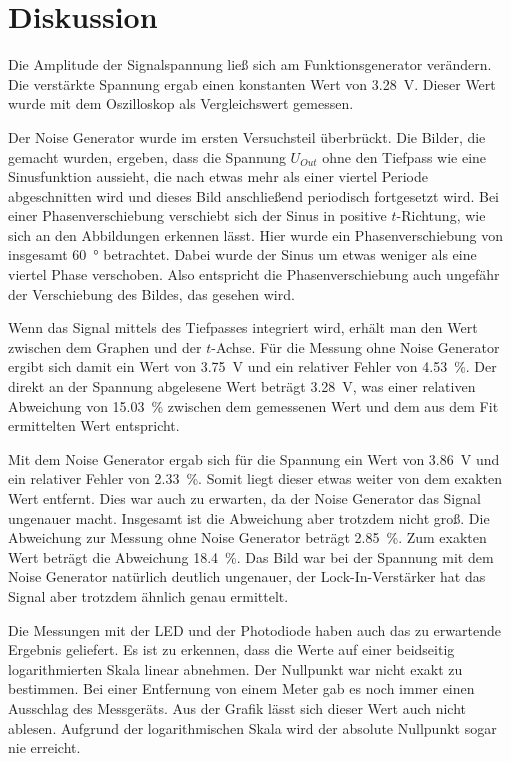 \section{Diskussion}
\label{sec:Diskussion}

Die Amplitude der Signalspannung ließ sich am Funktionsgenerator verändern. Die verstärkte Spannung ergab einen konstanten 
Wert von \SI{3.28}{\V}. Dieser Wert wurde mit dem Oszilloskop als Vergleichswert gemessen. %

\noindent Der Noise Generator wurde im ersten Versuchsteil überbrückt. Die Bilder, die gemacht wurden, ergeben, dass 
die Spannung $U_{Out}$ ohne den Tiefpass wie eine Sinusfunktion aussieht, die nach etwas mehr als einer viertel 
Periode abgeschnitten wird und dieses Bild anschließend periodisch fortgesetzt wird. 
Bei einer Phasenverschiebung verschiebt sich der Sinus in positive $t$-Richtung, wie sich an den Abbildungen 
erkennen lässt. Hier wurde ein Phasenverschiebung von insgesamt \SI{60}{\degree} betrachtet. %
Dabei wurde der Sinus 
um etwas weniger als eine viertel Phase verschoben. Also entspricht die Phasenverschiebung auch ungefähr der 
Verschiebung des Bildes, das gesehen wird. 

\noindent Wenn das Signal mittels des Tiefpasses integriert wird, erhält man den Wert zwischen dem Graphen und der 
$t$-Achse. Für die Messung ohne Noise Generator ergibt sich damit ein Wert von \SI{3.75}{\volt} und ein relativer 
Fehler von \SI{4.53}{\percent}. Der direkt an der Spannung abgelesene Wert beträgt \SI{3.28}{\volt}, was einer%
relativen Abweichung von \SI{15.03}{\percent} zwischen dem gemessenen Wert und dem aus dem Fit ermittelten Wert 
entspricht. 

\noindent Mit dem Noise Generator ergab sich für die Spannung ein Wert von \SI{3.86}{\volt} und ein relativer 
Fehler von \SI{2.33}{\percent}. Somit liegt dieser etwas weiter von dem exakten Wert entfernt. Dies war auch zu 
erwarten, da der Noise Generator das Signal ungenauer macht. Insgesamt ist die Abweichung aber trotzdem nicht %
groß. Die Abweichung zur Messung ohne Noise Generator beträgt \SI{2.85}{\percent}. Zum exakten Wert beträgt die 
Abweichung \SI{18.4}{\percent}. Das Bild war bei der Spannung mit dem Noise Generator natürlich deutlich ungenauer, 
der Lock-In-Verstärker hat das Signal aber trotzdem ähnlich genau ermittelt. 

\noindent Die Messungen mit der LED und der Photodiode haben auch das zu erwartende Ergebnis geliefert. Es ist zu 
erkennen, dass die Werte auf einer beidseitig logarithmierten Skala linear abnehmen. Der Nullpunkt war nicht exakt 
zu bestimmen. Bei einer Entfernung von einem Meter gab es noch immer einen Ausschlag des Messgeräts. Aus der Grafik 
lässt sich dieser Wert auch nicht ablesen. Aufgrund der logarithmischen Skala wird der absolute Nullpunkt sogar nie 
erreicht.  
